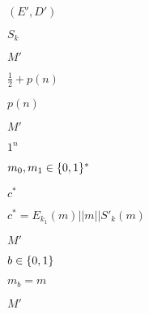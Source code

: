 \documentclass[10pt]{book}
\begin{document}
\begin{mdSnippets}
\begin{mdInlineSnippet}
$(E',D')$\end{mdInlineSnippet}%
\begin{mdInlineSnippet}[85c5cb7c4e2ae43f3450a97e3e6a9a39]%
$S_k$\end{mdInlineSnippet}%
\begin{mdInlineSnippet}[c0c8156de7a5455113e67f33c15182fb]%
$M'$\end{mdInlineSnippet}%
\begin{mdInlineSnippet}[64f5991003da134cc68fa343d048ebac]%
$\frac{1}{2} + p(n)$\end{mdInlineSnippet}%
\begin{mdInlineSnippet}%
$p(n)$\end{mdInlineSnippet}%
\begin{mdInlineSnippet}[c0c8156de7a5455113e67f33c15182fb]%
$M'$\end{mdInlineSnippet}%
\begin{mdInlineSnippet}%
$1^n$\end{mdInlineSnippet}%
\begin{mdInlineSnippet}[e8b194cc45a0b22695892b78da9ae349]%
$m_0,m_1 \in \{0,1\}^*$\end{mdInlineSnippet}%
\begin{mdInlineSnippet}%
$c^*$\end{mdInlineSnippet}%
\begin{mdInlineSnippet}[bf059790c511e7c178fdd218d417f994]%
$c^* = E_{k_1}(m) || m || S'_k(m)$\end{mdInlineSnippet}%
\begin{mdInlineSnippet}[c0c8156de7a5455113e67f33c15182fb]%
$M'$\end{mdInlineSnippet}%
\begin{mdInlineSnippet}[6892f7e7c3b8ecc19e4a077e82515567]%
$b \in \{0,1\}$\end{mdInlineSnippet}%
\begin{mdInlineSnippet}%
$m_b = m$\end{mdInlineSnippet}%
\begin{mdInlineSnippet}[c0c8156de7a5455113e67f33c15182fb]%
$M'$\end{mdInlineSnippet}%

\end{mdSnippets}
\end{document}
